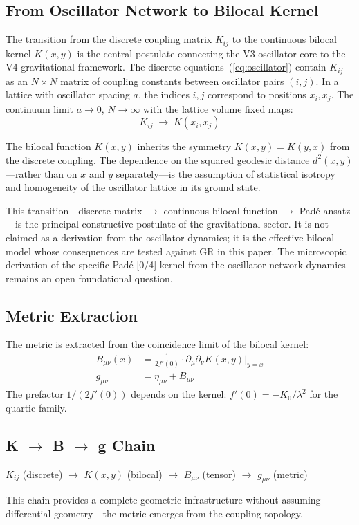 \documentclass[12pt]{article}
\begin{document}
\subsection{From Oscillator Network to Bilocal Kernel}
\label{sec:K_to_kernel}

The transition from the discrete coupling matrix $K_{ij}$ to the continuous bilocal kernel $K(x,y)$ is the central postulate connecting the V3 oscillator core to the V4 gravitational framework. The discrete equations~(\ref{eq:oscillator}) contain $K_{ij}$ as an $N\times N$ matrix of coupling constants between oscillator pairs $(i,j)$. In a lattice with oscillator spacing $a$, the indices $i,j$ correspond to positions $x_i, x_j$. The continuum limit $a\to 0$, $N\to\infty$ with the lattice volume fixed maps:
\begin{equation}
K_{ij} \;\longrightarrow\; K(x_i, x_j)
\end{equation}

The bilocal function $K(x,y)$ inherits the symmetry $K(x,y) = K(y,x)$ from the discrete coupling. The dependence on the squared geodesic distance $d^2(x,y)$---rather than on $x$ and $y$ separately---is the assumption of statistical isotropy and homogeneity of the oscillator lattice in its ground state.

This transition---discrete matrix $\to$ continuous bilocal function $\to$ Pad\'e ansatz---is the principal constructive postulate of the gravitational sector. It is not claimed as a derivation from the oscillator dynamics; it is the effective bilocal model whose consequences are tested against GR in this paper. The microscopic derivation of the specific Pad\'e [0/4] kernel from the oscillator network dynamics remains an open foundational question.

\subsection{Metric Extraction}

The metric is extracted from the coincidence limit of the bilocal kernel:
\begin{align}
B_{\mu\nu}(x) &= \frac{1}{2f'(0)} \cdot \partial_\mu \partial_\nu K(x,y)|_{y=x} \label{eq:metric1} \\
g_{\mu\nu} &= \eta_{\mu\nu} + B_{\mu\nu} \label{eq:metric2}
\end{align}
The prefactor $1/(2f'(0))$ depends on the kernel: $f'(0) = -K_0/\lambda^2$ for the quartic family.

\subsection{K $\to$ B $\to$ g Chain}
\begin{center}
$K_{ij}$ (discrete) $\to$ $K(x,y)$ (bilocal) $\to$ $B_{\mu\nu}$ (tensor) $\to$ $g_{\mu\nu}$ (metric)
\end{center}
This chain provides a complete geometric infrastructure without assuming differential geometry---the metric emerges from the coupling topology.
\end{document}
